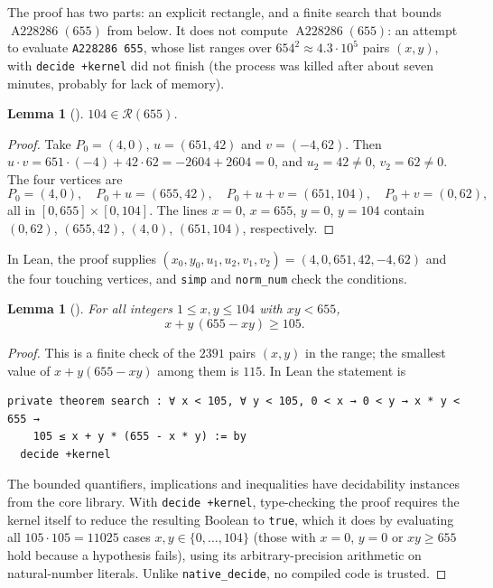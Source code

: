 \documentclass[11pt]{amsart}
\theoremstyle{plain}
\newtheorem{lemma}[theorem]{Lemma}
\theoremstyle{definition}
\newcommand{\R}{\mathcal{R}}
\newcommand{\Aa}{\operatorname{A228286}}
\begin{document}
The proof has two parts: an explicit rectangle, and a finite search that bounds $\Aa(655)$ from below. It does not compute $\Aa(655)$: an attempt to evaluate \texttt{A228286 655}, whose list ranges over $654^2\approx4.3\cdot10^5$ pairs $(x,y)$, with \texttt{decide +kernel} did not finish (the process was killed after about seven minutes, probably for lack of memory).

\begin{lemma}[]\label{lem:witness}
$104\in\R(655)$.
\end{lemma}

\begin{proof}
Take $P_0=(4,0)$, $u=(651,42)$ and $v=(-4,62)$. Then $u\cdot v=651\cdot(-4)+42\cdot62=-2604+2604=0$, and $u_2=42\ne0$, $v_2=62\ne0$. The four vertices are
\[
  P_0=(4,0),\quad P_0+u=(655,42),\quad P_0+u+v=(651,104),\quad P_0+v=(0,62),
\]
all in $[0,655]\times[0,104]$. The lines $x=0$, $x=655$, $y=0$, $y=104$ contain $(0,62)$, $(655,42)$, $(4,0)$, $(651,104)$, respectively.
\end{proof}

In Lean, the proof supplies $(x_0,y_0,u_1,u_2,v_1,v_2)=(4,0,651,42,-4,62)$ and the four touching vertices, and \texttt{simp} and \texttt{norm\_num} check the conditions.

\begin{lemma}[]\label{lem:search}
For all integers $1\le x,y\le104$ with $xy<655$,
\[
  x+y\,(655-xy)\ge105 .
\]
\end{lemma}

\begin{proof}
This is a finite check of the $2391$ pairs $(x,y)$ in the range; the smallest value of $x+y(655-xy)$ among them is $115$. In Lean the statement is
\begin{lstlisting}
private theorem search : ∀ x < 105, ∀ y < 105, 0 < x → 0 < y → x * y < 655 →
    105 ≤ x + y * (655 - x * y) := by
  decide +kernel
\end{lstlisting}
The bounded quantifiers, implications and inequalities have decidability instances from the core library. With \texttt{decide +kernel}, type-checking the proof requires the kernel itself to reduce the resulting Boolean to \texttt{true}, which it does by evaluating all $105\cdot105=11025$ cases $x,y\in\{0,\dots,104\}$ (those with $x=0$, $y=0$ or $xy\ge655$ hold because a hypothesis fails), using its arbitrary-precision arithmetic on natural-number literals. Unlike \texttt{native\_decide}, no compiled code is trusted.
\end{proof}
\end{document}
